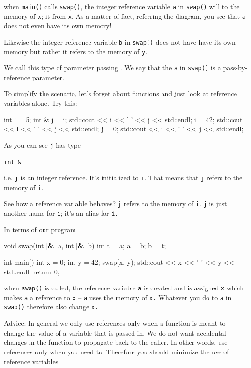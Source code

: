 when \texttt{main()} calls \texttt{swap()}, the integer reference variable \texttt{a} in \texttt{swap()} will  to the memory of \texttt{x}; it  from \texttt{x}. As a matter of fact, referring the diagram, you see that \texttt{a} does not even have its own memory!

Likewise the integer reference variable \texttt{b} in \texttt{swap()} does not have have its own memory but rather it refers to the memory of \texttt{y}.

We call this type of parameter passing . We say that the \texttt{a} in \texttt{swap()} is a pass-by-reference parameter.

To simplify the scenario, let's forget about functions and just look at reference variables alone. Try this:

\begin{consolethree}[escapeinside=||]
int i = 5;
int & j = i;
std::cout << i << ' ' << j << std::endl;
i = 42;
std::cout << i << ' ' << j << std::endl;
j = 0;
std::cout << i << ' ' << j << std::endl;
\end{consolethree}

As you can see \texttt{j} has type

\texttt{int \&}

i.e. \texttt{j} is an integer reference. It's initialized to \texttt{i}. That means that \texttt{j} refers to the memory of \texttt{i}.


See how a reference variable behaves? \texttt{j} refers to the memory of \texttt{i}. \texttt{j} is just another name for \texttt{i}; it's an alias for \texttt{i.}

In terms of our program

\begin{consolethree}[escapeinside=||]
void swap(int |\textbf{\&}| a, int |\textbf{\&}| b)
{
    int t = a;
    a = b;
    b = t;
}

int main()
{
    int x = 0;
    int y = 42;
    swap(x, y);
    std::cout << x << ' ' << y << std::endl;
    return 0;
}
\end{consolethree}

when \texttt{swap()} is called, the reference variable \texttt{a} is created and is assigned \texttt{x} which makes \texttt{a} a reference to \texttt{x} -- \texttt{a} uses the memory of \texttt{x.} Whatever you do to \texttt{a} in \texttt{swap()} therefore also change \texttt{x.}



Advice: In general we only use references only when a function is meant to change the value of a variable that is passed in. We do not want accidental changes in the function to propagate back to the caller. In other words, use references only when you need to. Therefore you should minimize the use of reference variables.


